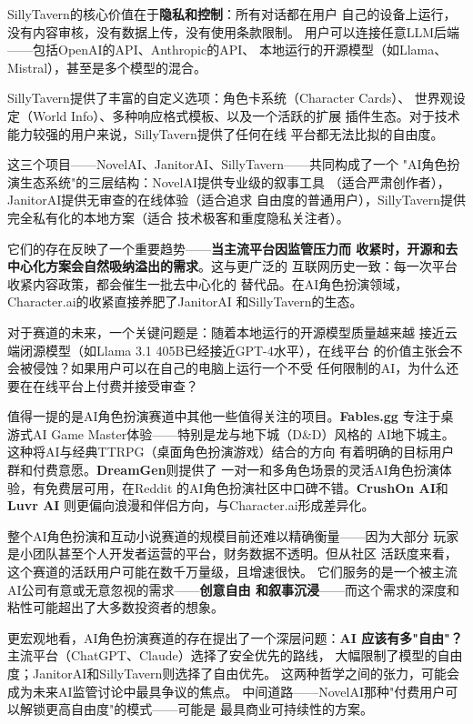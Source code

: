 SillyTavern的核心价值在于\textbf{隐私和控制}：所有对话都在用户
自己的设备上运行，没有内容审核，没有数据上传，没有使用条款限制。
用户可以连接任意LLM后端——包括OpenAI的API、Anthropic的API、
本地运行的开源模型（如Llama、Mistral），甚至是多个模型的混合。

SillyTavern提供了丰富的自定义选项：角色卡系统（Character Cards）、
世界观设定（World Info）、多种响应格式模板、以及一个活跃的扩展
插件生态。对于技术能力较强的用户来说，SillyTavern提供了任何在线
平台都无法比拟的自由度。

这三个项目——NovelAI、JanitorAI、SillyTavern——共同构成了一个
"AI角色扮演生态系统"的三层结构：NovelAI提供专业级的叙事工具
（适合严肃创作者），JanitorAI提供无审查的在线体验（适合追求
自由度的普通用户），SillyTavern提供完全私有化的本地方案（适合
技术极客和重度隐私关注者）。

它们的存在反映了一个重要趋势——\textbf{当主流平台因监管压力而
收紧时，开源和去中心化方案会自然吸纳溢出的需求}。这与更广泛的
互联网历史一致：每一次平台收紧内容政策，都会催生一批去中心化的
替代品。在AI角色扮演领域，Character.ai的收紧直接养肥了JanitorAI
和SillyTavern的生态。

对于赛道的未来，一个关键问题是：随着本地运行的开源模型质量越来越
接近云端闭源模型（如Llama 3.1 405B已经接近GPT-4水平），在线平台
的价值主张会不会被侵蚀？如果用户可以在自己的电脑上运行一个不受
任何限制的AI，为什么还要在在线平台上付费并接受审查？

值得一提的是AI角色扮演赛道中其他一些值得关注的项目。\textbf{Fables.gg}
专注于桌游式AI Game Master体验——特别是龙与地下城（D\&D）风格的
AI地下城主。这种将AI与经典TTRPG（桌面角色扮演游戏）结合的方向
有着明确的目标用户群和付费意愿。\textbf{DreamGen}则提供了
一对一和多角色场景的灵活AI角色扮演体验，有免费层可用，在Reddit
的AI角色扮演社区中口碑不错。\textbf{CrushOn AI}和\textbf{Luvr AI}
则更偏向浪漫和伴侣方向，与Character.ai形成差异化。

整个AI角色扮演和互动小说赛道的规模目前还难以精确衡量——因为大部分
玩家是小团队甚至个人开发者运营的平台，财务数据不透明。但从社区
活跃度来看，这个赛道的活跃用户可能在数千万量级，且增速很快。
它们服务的是一个被主流AI公司有意或无意忽视的需求——\textbf{创意自由
和叙事沉浸}——而这个需求的深度和粘性可能超出了大多数投资者的想象。

更宏观地看，AI角色扮演赛道的存在提出了一个深层问题：\textbf{AI
应该有多"自由"？}主流平台（ChatGPT、Claude）选择了安全优先的路线，
大幅限制了模型的自由度；JanitorAI和SillyTavern则选择了自由优先。
这两种哲学之间的张力，可能会成为未来AI监管讨论中最具争议的焦点。
中间道路——NovelAI那种"付费用户可以解锁更高自由度"的模式——可能是
最具商业可持续性的方案。


